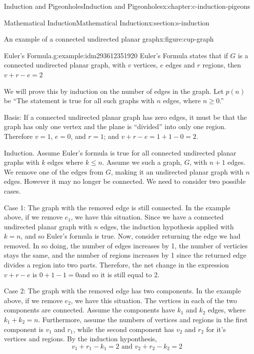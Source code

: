 \documentclass[twoside,10pt,]{book}
\numberwithin{equation}{section}
\begin{document}
\begin{chapterptx}{Induction and Pigeonholes}{}{Induction and Pigeonholes}{}{}{x:chapter:c-induction-pigeons}
\begin{sectionptx}{Mathematical Induction}{}{Mathematical Induction}{}{}{x:section:s-induction}
\begin{figureptx}{An example of a connected undirected planar graph}{x:figure:cup-graph}{}
\begin{image}{0}{1}{0}
\end{image}%
\tcblower
\end{figureptx}%
\begin{example}{Euler's Formula.}{g:example:idm293612351920}%
%
Euler's Formula states that if \(G\) is a connected undirected planar graph, with \(v\) vertices, \(e\) edges and \(r\) regions, then \(v+r-e=2\)%
\par
We will prove this by induction on the number of edges in the graph.  Let \(p(n)\) be ``The statement is true for all such graphs with \(n\) edges, where \(n\geq 0\).''%
\par
Basis:  If a connected undirected planar graph has zero edges, it must be that the graph has only one vertex and the plane is  ``divided'' into only one region.  Therefore \(v=1\), \(e=0\), and \(r=1\); and   \(v+r-e=1+1-0 =2\).%
\par
Induction.  Assume Euler's formula is true for all connected undirected planar graphs  with \(k\) edges where \(k\leq n\).   Assume we such a graph, \(G\), with \(n+1\) edges.  We remove one of the edges from \(G\), making it an undirected planar graph with \(n\) edges.  However it may no longer be connected.  We need to consider two possible cases.%
\par
Case 1:  The graph with the removed edge is still connected. In the example above, if we remove \(e_1\), we have this situation.  Since we have a connected undirected planar graph with \(n\) edges, the induction hypothesis applied with \(k=n\), and so Euler's formula is true.  Now, consider returning the edge we had removed.  In so doing, the number of edges increases by 1, the number of verticies stays the same, and the number of regions increases by 1 since the returned edge divides a region into two parts.  Therefore, the net change in the expression \(v+r-e\) is \(0+1-1=0\)and so it is still equal to 2.%
\par
Case 2: The graph with the removed edge has two components. In the example above, if we remove \(e_2\), we have this situation.   The vertices in each of the two components are connected.  Assume the components have \(k_1\) and \(k_2\) edges, where \(k_1+k_2= n\).  Furthermore, assume the numbers of vertices and regions in the first component is \(v_1\) and \(r_1\), while the second component has \(v_2\) and \(r_2\) for it\textbraceleft{}'\textbraceright{}s vertices and regions. By the induction hyponthesis,%
\begin{equation*}
v_1+r_1-k_1=2 \textrm{ and } v_2+r_2-k_2=2

\end{equation*}
\end{example}
\end{sectionptx}
\end{chapterptx}
\end{document}
